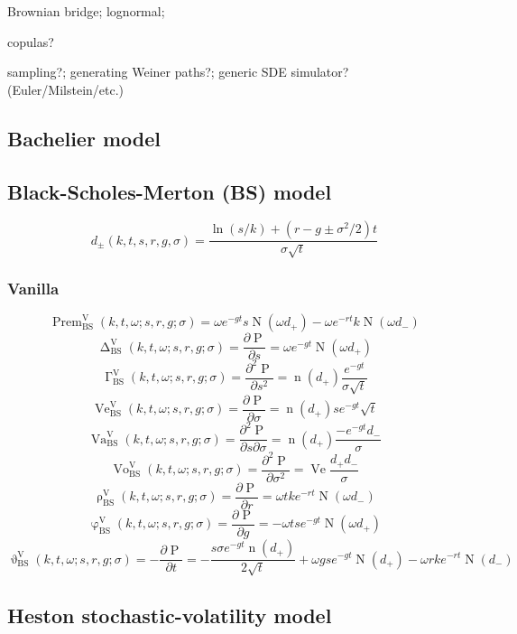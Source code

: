 \documentclass[10pt,dvipdfmx,letterpaper,twoside]{article}
\let\O=\operatorname
\let\Gam=\Gamma
\let\sig=\sigma
\let\theta=\vartheta
\let\phi=\varphi
\let\om=\omega
\begin{document}
Brownian bridge; lognormal;

copulas?

sampling?; generating Weiner paths?; generic SDE simulator? (Euler/Milstein/etc.)

\subsection{Bachelier model}

\subsection{Black-Scholes-Merton (BS) model}

\[ d_{\pm}(k,t,s,r,g,\sig) = \frac{\ln(s/k) + (r-g\pm\sig^2/2)t}{\sig\sqrt{t}} \]

\subsubsection{Vanilla}
\[ \O{Prem}^\text{V}_\text{BS}(k, t, \om; s, r, g; \sig)
  = \om e^{-gt}s\O{N}(\om d_+) - \om e^{-rt}k\O{N}(\om d_-) \]
\[ \O{\Delta}^\text{V}_\text{BS}(k, t, \om; s, r, g; \sig) = \frac{\partial\O{P}}{\partial s}
  = \om e^{-gt}\O{N}(\om d_+) \]
\[ \O{\Gam}^\text{V}_\text{BS}(k, t, \om; s, r, g; \sig) = \frac{\partial^2\O{P}}{\partial s^2}
  = \O{n}(d_+)\frac{e^{-gt}}{\sig\sqrt{t}} \]
\[ \O{Ve}^\text{V}_\text{BS}(k, t, \om; s, r, g; \sig) = \frac{\partial\O{P}}{\partial \sig}
  = \O{n}(d_+) s e^{-gt}\sqrt{t} \]
\[ \O{Va}^\text{V}_\text{BS}(k, t, \om; s, r, g; \sig) = \frac{\partial^2\O{P}}{\partial s\partial\sig}
  = \O{n}(d_+)\frac{-e^{-gt}d_-}{\sig} \]
\[ \O{Vo}^\text{V}_\text{BS}(k, t, \om; s, r, g; \sig) = \frac{\partial^2\O{P}}{\partial \sig^2}
  = \O{Ve}\frac{d_+ d_-}{\sig} \]
\[ \O{\rho}^\text{V}_\text{BS}(k, t, \om; s, r, g; \sig) = \frac{\partial\O{P}}{\partial r}
  = \om t k e^{-rt} \O{N}(\om d_-) \]
\[ \O{\phi}^\text{V}_\text{BS}(k, t, \om; s, r, g; \sig) = \frac{\partial\O{P}}{\partial g}
  = -\om t s e^{-gt} \O{N}(\om d_+) \]
\[ \O{\theta}^\text{V}_\text{BS}(k, t, \om; s, r, g; \sig) = -\frac{\partial\O{P}}{\partial t}
  = -\frac{s \sig e^{-gt} \O{n}(d_+)}{2\sqrt{t}} + \om g s e^{-gt}\O{N}(d_+) - \om r k e^{-rt}\O{N}(d_-) \]

\subsection{Heston stochastic-volatility model}
\end{document}
